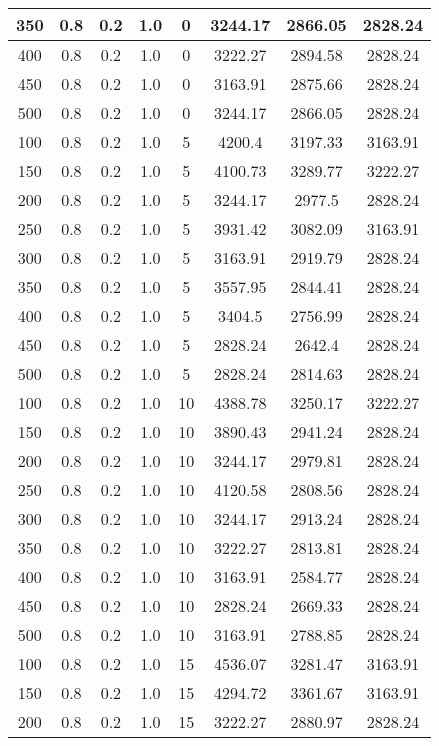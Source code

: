 \documentclass[a4paper, 12pt]{extreport}
\begin{document}
\begin{itemize}
\begin{longtable}{|c|c|c|c|c|c|c|c|}
			350 & 0.8 & 0.2 & 1.0 & 0 & 3244.17 & 2866.05 & 2828.24 \\\hline
			400 & 0.8 & 0.2 & 1.0 & 0 & 3222.27 & 2894.58 & 2828.24 \\\hline
			450 & 0.8 & 0.2 & 1.0 & 0 & 3163.91 & 2875.66 & 2828.24 \\\hline
			500 & 0.8 & 0.2 & 1.0 & 0 & 3244.17 & 2866.05 & 2828.24 \\\hline
			100 & 0.8 & 0.2 & 1.0 & 5 & 4200.4 & 3197.33 & 3163.91 \\\hline
			150 & 0.8 & 0.2 & 1.0 & 5 & 4100.73 & 3289.77 & 3222.27 \\\hline
			200 & 0.8 & 0.2 & 1.0 & 5 & 3244.17 & 2977.5 & 2828.24 \\\hline
			250 & 0.8 & 0.2 & 1.0 & 5 & 3931.42 & 3082.09 & 3163.91 \\\hline
			300 & 0.8 & 0.2 & 1.0 & 5 & 3163.91 & 2919.79 & 2828.24 \\\hline
			350 & 0.8 & 0.2 & 1.0 & 5 & 3557.95 & 2844.41 & 2828.24 \\\hline
			400 & 0.8 & 0.2 & 1.0 & 5 & 3404.5 & 2756.99 & 2828.24 \\\hline
			450 & 0.8 & 0.2 & 1.0 & 5 & 2828.24 & 2642.4 & 2828.24 \\\hline
			500 & 0.8 & 0.2 & 1.0 & 5 & 2828.24 & 2814.63 & 2828.24 \\\hline
			100 & 0.8 & 0.2 & 1.0 & 10 & 4388.78 & 3250.17 & 3222.27 \\\hline
			150 & 0.8 & 0.2 & 1.0 & 10 & 3890.43 & 2941.24 & 2828.24 \\\hline
			200 & 0.8 & 0.2 & 1.0 & 10 & 3244.17 & 2979.81 & 2828.24 \\\hline
			250 & 0.8 & 0.2 & 1.0 & 10 & 4120.58 & 2808.56 & 2828.24 \\\hline
			300 & 0.8 & 0.2 & 1.0 & 10 & 3244.17 & 2913.24 & 2828.24 \\\hline
			350 & 0.8 & 0.2 & 1.0 & 10 & 3222.27 & 2813.81 & 2828.24 \\\hline
			400 & 0.8 & 0.2 & 1.0 & 10 & 3163.91 & 2584.77 & 2828.24 \\\hline
			450 & 0.8 & 0.2 & 1.0 & 10 & 2828.24 & 2669.33 & 2828.24 \\\hline
			500 & 0.8 & 0.2 & 1.0 & 10 & 3163.91 & 2788.85 & 2828.24 \\\hline
			100 & 0.8 & 0.2 & 1.0 & 15 & 4536.07 & 3281.47 & 3163.91 \\\hline
			150 & 0.8 & 0.2 & 1.0 & 15 & 4294.72 & 3361.67 & 3163.91 \\\hline
			200 & 0.8 & 0.2 & 1.0 & 15 & 3222.27 & 2880.97 & 2828.24 \\\hline

\end{longtable}
\end{itemize}
\end{document}
